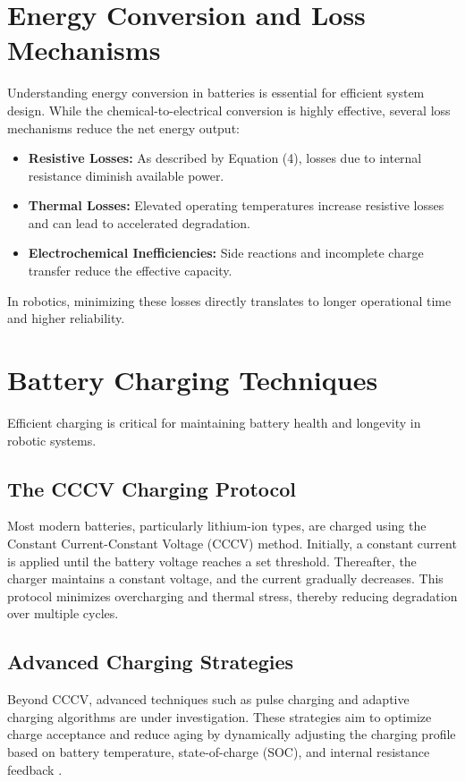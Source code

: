 \section{Energy Conversion and Loss Mechanisms}
Understanding energy conversion in batteries is essential for efficient system design. While the chemical-to-electrical conversion is highly effective, several loss mechanisms reduce the net energy output:
\begin{itemize}
    \item \textbf{Resistive Losses:} As described by Equation (4), losses due to internal resistance diminish available power.
    \item \textbf{Thermal Losses:} Elevated operating temperatures increase resistive losses and can lead to accelerated degradation.
    \item \textbf{Electrochemical Inefficiencies:} Side reactions and incomplete charge transfer reduce the effective capacity.
\end{itemize}
In robotics, minimizing these losses directly translates to longer operational time and higher reliability.

\section{Battery Charging Techniques}
Efficient charging is critical for maintaining battery health and longevity in robotic systems.

\subsection{The CCCV Charging Protocol}
Most modern batteries, particularly lithium-ion types, are charged using the Constant Current-Constant Voltage (CCCV) method. Initially, a constant current is applied until the battery voltage reaches a set threshold. Thereafter, the charger maintains a constant voltage, and the current gradually decreases. This protocol minimizes overcharging and thermal stress, thereby reducing degradation over multiple cycles.

\subsection{Advanced Charging Strategies}
Beyond CCCV, advanced techniques such as pulse charging and adaptive charging algorithms are under investigation. These strategies aim to optimize charge acceptance and reduce aging by dynamically adjusting the charging profile based on battery temperature, state-of-charge (SOC), and internal resistance feedback \cite{Rauf2022}.

